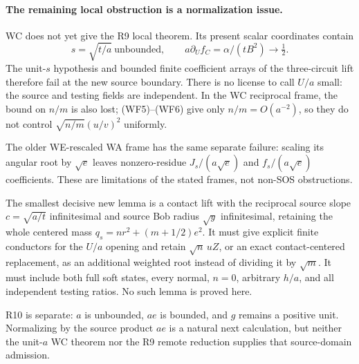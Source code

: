 \paragraph{The remaining local obstruction is a normalization issue.}
WC does not yet give the R9 local theorem. Its present scalar
coordinates contain
\[
 s=\sqrt{t/a}\ \text{unbounded},\qquad
 a\partial_U f_C=\alpha/(tB^2)\longrightarrow\tfrac12.
                                                               \tag{WF8}
\]
The unit-$s$ hypothesis and bounded finite coefficient arrays of
the three-circuit lift therefore fail at the new source boundary.
There is no license to call $U/a$ small: the source and testing
fields are independent. In the WC reciprocal frame, the bound on
$n/m$ is also lost; (WF5)--(WF6) give only $n/m=O(a^{-2})$,
so they do not control $\sqrt{n/m}(u/v)^2$ uniformly.

The older WE-rescaled WA frame has the same separate failure:
scaling its angular root by $\sqrt e$ leaves nonzero-residue
$J_s/(a\sqrt e)$ and $f_s/(a\sqrt e)$ coefficients. These are
limitations of the stated frames, not non-SOS obstructions.

The smallest decisive new lemma is a contact lift with the
reciprocal source slope $c=\sqrt{a/t}$ infinitesimal and source
Bob radius $\sqrt y$ infinitesimal, retaining the whole centered
mass $q_s=nr^2+(m+1/2)e^2$. It must give explicit finite conductors
for the $U/a$ opening and retain $\sqrt n\,uZ$, or an exact
contact-centered replacement, as an additional weighted root
instead of dividing it by $\sqrt m$. It must include both full
soft states, every normal, $n=0$, arbitrary $h/a$, and all
independent testing ratios. No such lemma is proved here.

R10 is separate: $a$ is unbounded, $ae$ is bounded, and $g$ remains
a positive unit. Normalizing by the source product $ae$ is a
natural next calculation, but neither the unit-$a$ WC theorem nor
the R9 remote reduction supplies that source-domain admission.

